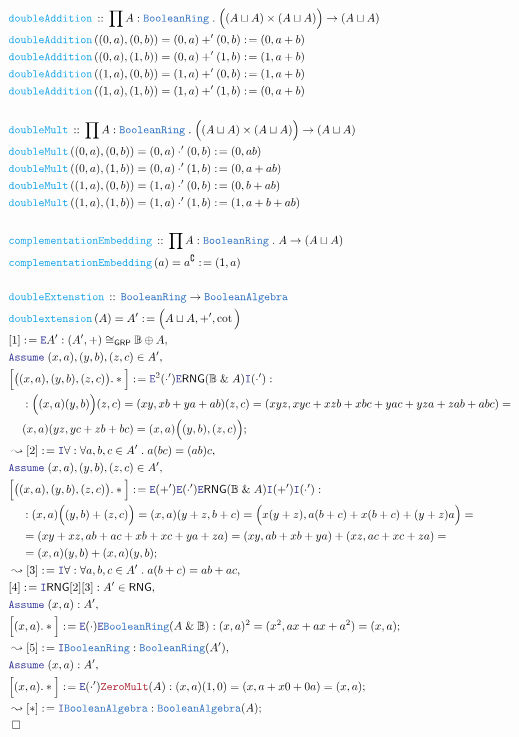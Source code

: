 \documentclass[12pt]{scrartcl}
\newcommand{\TYPE}[1]{\textcolor{NavyBlue}{\mathtt{#1}}}
\newcommand{\FUNC}[1]{\textcolor{Cerulean}{\mathtt{#1}}}
\newcommand{\LOGIC}[1]{\textcolor{Blue}{\mathtt{#1}}}
\newcommand{\THM}[1]{\textcolor{Maroon}{\mathtt{#1}}}
\renewcommand{\.}{\; . \;}
\newcommand{\de}{: \kern 0.1pc =}
\newcommand{\Act}[1]{\left( #1 \right)}
\newcommand{\DeclareFunc}[2]{& \FUNC{#1} \, :: \, #2 \\}
\newcommand{\DefineNamedFunc}[4]{&  \FUNC{#1}\Act{#2} = #3 \de #4 \\}
\newcommand{\NewLine}{\\ & \kern 1pc}
\newcommand{\Page}[1]{ \begin{align*} #1 \end{align*}   }
\renewcommand{\And}{\; \& \;}
\newcommand{\Intro}{\LOGIC{I}}
\newcommand{\Elim}{\LOGIC{E}}
\renewcommand{\c}{\complement}
\newcommand{\Say}[3]{& #1 \de #2 : #3, \\}
\newcommand{\Conclude}[3]{& #1 \de #2 : #3; \\}
\newcommand{\Derive}[3]{& \leadsto #1 \de #2 : #3, \\}
\newcommand{\DeriveConclude}[3]{& \leadsto #1 \de #2 : #3 ; \\}
\newcommand{\Assume}[2]{& \LOGIC{Assume} \; #1 : #2, \\}
\newcommand{\AssumeIn}[2]{& \LOGIC{Assume} \; #1 \in #2, \\}
\newcommand{\QED}{\; \square}
\newcommand{\EndProof}{& \QED \\}
\newcommand{\GRP}{\mathsf{GRP}}
\newcommand{\RNG}{\mathsf{RNG}}
\newcommand{\Bool}{\mathbb{B}}
\newcommand{\BR}{\TYPE{BooleanRing}}
\newcommand{\BA}{\TYPE{BooleanAlgebra}}
\begin{document}
\Page{
	\DeclareFunc{doubleAddition}{\prod A : \BR \. \Big((A \sqcup A) \times (A \sqcup A)\Big) \to (A \sqcup A)}
	\DefineNamedFunc{doubleAddition}{ (0,a),(0,b) }{(0,a) +' (0,b)}{(0,a + b)}
	\DefineNamedFunc{doubleAddition}{ (0,a),(1,b) }{(0,a) +' (1,b)}{(1,a + b)}
	\DefineNamedFunc{doubleAddition}{ (1,a),(0,b) }{(1,a) +' (0,b)}{(1,a + b)}
	\DefineNamedFunc{doubleAddition}{ (1,a),(1,b) }{(1,a) +' (1,b)}{(0,a + b)}
	\\
	\DeclareFunc{doubleMult}{\prod A : \BR \. \Big((A \sqcup A) \times (A \sqcup A)\Big) \to (A \sqcup A)}
	\DefineNamedFunc{doubleMult}{ (0,a),(0,b) }{(0,a) \cdot' (0,b)}{(0,ab)}
	\DefineNamedFunc{doubleMult}{ (0,a),(1,b) }{(0,a) \cdot' (1,b)}{(0,a + ab)}
	\DefineNamedFunc{doubleMult}{ (1,a),(0,b) }{(1,a) \cdot' (0,b)}{(0,b + ab)}
	\DefineNamedFunc{doubleMult}{ (1,a),(1,b) }{(1,a) \cdot' (1,b)}{(1,a + b + ab)}
	\\
	\DeclareFunc{complementationEmbedding}{\prod A : \BR \. A \to (A \sqcup A)}
	\DefineNamedFunc{complementationEmbedding}{a}{a^\c}{(1,a)}
	\\
	\DeclareFunc{doubleExtenstion}{\BR \to \BA}
	\DefineNamedFunc{doublextension}{A}{A'}{ \Big(A \sqcup A,+',\cot\Big) }
	\Say{[1]}{\Elim A'}{(A',+) \cong_\GRP \Bool \oplus A}
	\AssumeIn{ (x,a),(y,b),(z,c)}{A'}
	\Conclude{\Big[\big((x,a),(y,b),(z,c)\big).*\Big]}
	{
		\Elim^2 (\cdot') \Elim \RNG(\Bool \And A) \Intro (\cdot')
	}
	{
		\NewLine :
		\Big((x,a)(y,b) \Big) (z,c) =
		(xy,xb + ya + ab)(z,c)  =
		( xyz, xyc + xzb  +xbc + yac + yza +  zab + abc  ) = \NewLine
		(x,a) (yz, yc + zb + bc) = (x,a) \Big( (y,b),(z,c)\Big)
	}
	\Derive{[2]}{\Intro \forall}{\forall a,b,c \in A' \. a(bc) =(ab)c}
	\AssumeIn{ (x,a),(y,b),(z,c)}{A'}
	\Conclude{\Big[\big((x,a),(y,b),(z,c)\big).*\Big]}
	{
		\Elim (+')
		\Elim (\cdot')
		\Elim \RNG(\Bool \And A)
		\Intro (+')
		\Intro (\cdot')
	}
	{
		\NewLine : 
		(x,a)\Big( (y,b) + (z,c) \Big) = 
		(x,a)(y+z,b + c) =
		\Big( x(y + z),  a(b + c) +  x(b + c) + (y + z)a \Big) = \NewLine = 
		( xy + xz,   ab + ac + xb + xc + ya + za ) = 
		(xy, ab + xb + ya) + (xz,ac + xc + za ) = \NewLine =  
		(x,a)(y,b) + (x,a)(y,b)
	}
	\Derive{[3]}{\Intro \forall}{\forall a,b,c \in A' \. a(b + c) = ab + ac}
	\Say{[4]}{ \Intro \RNG[2][3] }{A' \in \RNG}
	\Assume{(x,a)}{A'}
	\Conclude{\Big[(x,a).*\Big]}{\Elim (\cdot)\Elim \BR(A \And \Bool)}
	{
		(x,a)^2  = (x^2, ax + ax + a^2) = (x,a)
	}
	\Derive{[5]}{\Intro \BR}{\BR(A')}
	\Assume{(x,a)}{A'}
	\Conclude{\Big[(x,a).*\Big]}{\Elim (\cdot') \THM{ZeroMult}(A)}
	{
		(x,a)(1,0) = (x, a + x0 + 0a  ) = (x,a)
	}
	\DeriveConclude{[*]}{\Intro \BA}{\BA(A)}
	\EndProof
}
\end{document}
